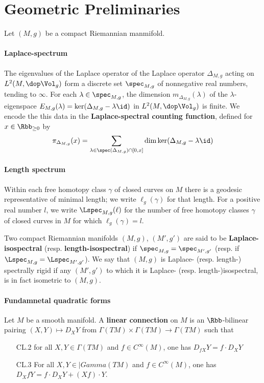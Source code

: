\section{Geometric Preliminaries}
Let $(M,g)$ be a compact Riemannian manmifold.
\paragraph{Laplace-spectrum}
The eigenvalues of the Laplace operator of the Laplace operator $\Delta_{M,g}$ acting on $L^2(M,\dop \Vol_g)$ form a discrete set $\spec_{M,g}$ of nonnegative real numbers, tending to $\infty$. For each $\lambda \in \spec_{M,g}$, the dimension $m_{\Delta_{M,g}}(\lambda)$ of the $\lambda$-eigenspace $E_{M,g}(\lambda)=\ker (\Delta_{M,g}- \lambda \id)$ in $L^2(M, \dop \Vol_g)$ is finite. We encode the this data in the \textbf{Laplace-spectral counting function}, defined for $x\in \Rbb_{\geq 0}$ by
\begin{align}
  \pi_{\Delta_{M,g}}(x) = \sum_{\lambda \in \spec(\Delta_{M,g}) \cap [0,x]} \dim \ker (\Delta_{M,g} - \lambda \id )
\end{align}


\paragraph{Length spectrum}
Within each free homotopy class $\gamma$ of closed curves on $M$ there is a geodesic representative of minimal length; we write $\ell_g(\gamma)$ for that length. For a positive real number $l$, we write $\Lspec_{M,g}(\ell)$ for the number of free homotopy classes $\gamma$ of closed curves in $M$ for which $\ell_g(\gamma) = l$.


Two compact Riemannian manifolds $(M,g)$, $(M',g')$  are said to be \textbf{Laplace-isospectral} (resp. \textbf{length-isospectral})  if $\spec_{M,g} = \spec_{M',g'}$ (resp.  if $\Lspec_{M,g}=\Lspec_{M',g'}$). We say that $(M,g)$ is Laplace- (resp. length-) spectrally rigid if any $(M',g')$ to which it is Laplace- (resp. length-)isospectral, is in fact isometric to $(M,g)$.

\paragraph{Fundamnetal quadratic forms}
Let $M$ be a smooth manifold. A \textbf{linear connection} on $M$ is an $\Rbb$-bilinear pairing $(X,Y) \mapsto D_X Y$ from $\Gamma(TM)\times \Gamma(TM) \to \Gamma(TM)$ such that
\begin{enumerate}
  \item[CL.2] for all $X,Y \in \Gamma(TM)$ and $f\in C^\infty(M)$, one has $D_{fX} Y = f\cdot D_X Y$
  \item[CL.3] For all $X,Y\in |Gamma(TM)$ and $f\in C^\infty (M)$, one has  $D_{X}fY = f\cdot D_X Y+ (Xf)\cdot Y$.
\end{enumerate}

